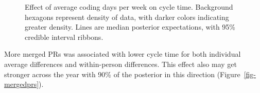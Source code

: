 \documentclass[manuscript,screen,review]{acmart}
\begin{document}
\begin{figure}


\caption[Coding days per week effect on cycle
time]{\label{fig-codingdays}Effect of average coding days per week on
cycle time. Background hexagons represent density of data, with darker
colors indicating greater density. Lines are median posterior
expectations, with 95\% credible interval ribbons.}

\end{figure}%

More merged PRs was associated with lower cycle time for both individual
average differences and within-person differences. This effect also may
get stronger across the year with 90\% of the posterior in this
direction (Figure~\ref{fig-mergedprs}).
\end{document}
